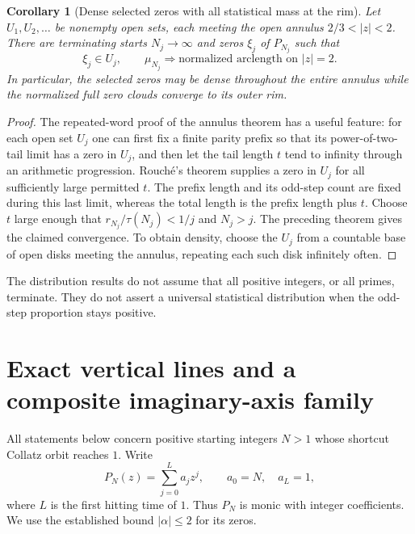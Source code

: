 \documentclass[11pt,a4paper]{article}
\newtheorem{corollary}[theorem]{Corollary}
\theoremstyle{definition}
\theoremstyle{remark}
\numberwithin{equation}{section}
\begin{document}
\begin{corollary}[Dense selected zeros with all statistical mass at the rim]
\label{C:cor:zd-density-versus-mass}
Let $U_1,U_2,\ldots$ be nonempty open sets, each meeting the open
annulus $2/3<|z|<2$. There are terminating starts $N_j\to\infty$
and zeros $\xi_j$ of $P_{N_j}$ such that
\[
 \xi_j\in U_j,\qquad
 \mu_{N_j}\Longrightarrow\text{normalized arclength on }|z|=2.
\]
In particular, the selected zeros may be dense throughout the entire
annulus while the normalized full zero clouds converge to its outer rim.
\end{corollary}
\begin{proof}
The repeated-word proof of the annulus theorem has a useful feature:
for each open set $U_j$ one can first fix a finite parity prefix so that
its power-of-two-tail limit has a zero in $U_j$, and then let the tail
length $t$ tend to infinity through an arithmetic progression.
Rouch\'e's theorem supplies a zero in $U_j$ for all sufficiently large
permitted $t$. The prefix length and its odd-step count are fixed during
this last limit, whereas the total length is the prefix length plus $t$.
Choose $t$ large enough that $r_{N_j}/\tau(N_j)<1/j$ and $N_j>j$.
The preceding theorem gives the claimed convergence. To obtain density,
choose the $U_j$ from a countable base of open disks meeting the annulus,
repeating each such disk infinitely often.
\end{proof}

The distribution results do not assume that all positive integers, or all
primes, terminate. They do not assert a universal statistical distribution
when the odd-step proportion stays positive.

\section{Exact vertical lines and a composite imaginary-axis family}

All statements below concern positive starting integers $N>1$ whose shortcut Collatz
orbit reaches $1$. Write
\[
 P_N(z)=\sum_{j=0}^{L}a_jz^j,\qquad a_0=N,\quad a_L=1,
\]
where $L$ is the first hitting time of $1$. Thus $P_N$ is monic with integer
coefficients. We use the established bound $|\alpha|\leq2$ for its zeros.
\end{document}
